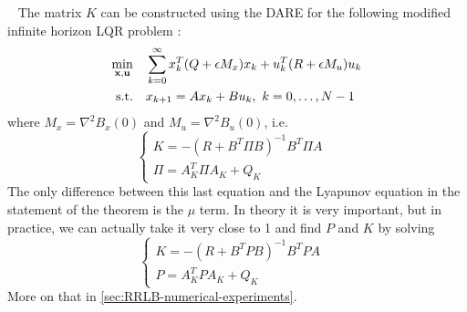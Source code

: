 \documentclass[12pt]{article}
\begin{document}
\begin{remark}~
	The matrix $K$ can be constructed using the DARE for the following modified infinite horizon LQR problem :
	\begin{align}
		\begin{split}\label{eq:inf-LQR}
			\underset{\bf{x},\bf{u}}{\min} &\quad \sum_{k=0}^\infty x_k^T(Q+\epsilon M_x)x_k+u_k^T(R+\epsilon M_u)u_k\\
			\text{s.t.} &\quad x_{k+1}=Ax_k+Bu_k,~k=0,\dots,N-1\\
		\end{split}
	\end{align}
	where $M_x=\nabla^2B_x(0)$ and $M_u=\nabla^2B_u(0)$, i.e.
	$$\begin{cases}
		K=-(R+B^T\Pi B)^{-1}B^T\Pi A&\\
		\Pi=A_K^T\Pi A_K+Q_K
	\end{cases}$$
	The only difference between this last equation and the Lyapunov equation in the statement of the theorem is the $\mu$ term.
	In theory it is very important, but in practice, we can actually take it very close to 1 and find $P$ and $K$ by solving
	$$\begin{cases}
		K=-(R+B^TP B)^{-1}B^TP A&\\
		P=A_K^TP A_K+Q_K
	\end{cases}$$
	More on that in \ref{sec:RRLB-numerical-experiments}.
\end{remark}
\end{document}
